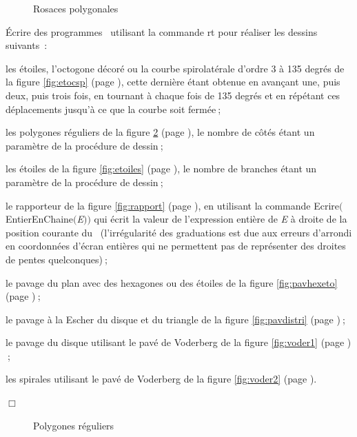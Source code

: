 \begin{figure}[htbp]
 \caption{Rosaces polygonales}\label{fig:rospol}
\end{figure}
\begin{exercices}{Écrire des programmes \pascal\  utilisant la commande {\idt rt}
pour réaliser les dessins suivants~:

\tiret les étoiles, l'octogone décoré ou la courbe spirolatérale d'ordre 3 à 135 degrés de la figure 
         \ref{fig:etocsp} (page \pageref{fig:etocsp}), cette dernière étant obtenue en avançant une, puis deux, puis
		 trois fois, en tournant à chaque fois de 135 degrés et en répétant ces déplacements jusqu'à ce que
		 la courbe soit fermée$\:$;

\tiret les polygones réguliers de la figure 
         \ref{fig:polyreg} (page \pageref{fig:polyreg}), le nombre de côtés étant un paramètre de la procédure
		 de dessin$\:$;

\tiret les étoiles de la figure 
         \ref{fig:etoiles} (page \pageref{fig:etoiles}), le nombre de branches étant un paramètre de la procédure
		 de dessin$\:$;

\tiret le rapporteur de la figure 
         \ref{fig:rapport} (page \pageref{fig:rapport}), en utilisant la commande
		 {\idt Ecrire$($ EntierEnChaine$(${\em E\/}$) )$} qui écrit la valeur de l'expression entière de {\em E}
		 à droite de la position courante du \robot\ (l'irrégularité des graduations
		 est due aux erreurs d'arrondi en coordonnées d'écran entières qui ne permettent pas de
		 représenter des droites de pentes quelconques)$\:$;

\tiret le pavage du plan avec des hexagones ou des étoiles de la figure 
         \ref{fig:pavhexeto} (page \pageref{fig:pavhexeto})$\:$;

\tiret le pavage à la Escher \cite{escher1} du disque et du triangle de la figure 
         \ref{fig:pavdistri} (page \pageref{fig:pavdistri})$\:$;

\tiret le pavage du disque utilisant le pavé de Voderberg \cite{voderberg} de la figure 
         \ref{fig:voder1} (page \pageref{fig:voder1})$\:$;

\tiret les spirales utilisant le pavé de Voderberg \cite{voderberg} de la 
         figure \ref{fig:voder2} (page \pageref{fig:voder2}).

\noindent $\Box$}\end{exercices}
\begin{figure}[htbp]
 \caption{Polygones réguliers}\label{fig:polyreg}
\end{figure}

